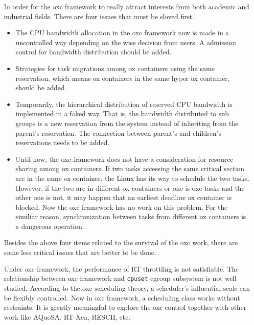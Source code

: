 In order for the oxc framework to really attract interests from both 
academic and industrial fields. There are four issues that must be 
sloved first.

\begin{itemize}
\item The CPU bandwidth allocation in the oxc framework now is made in 
a uncontrolled way depending on the wise decision from users. A admission
control for bandwidth distribution should be added.
\item Strategies for task migrations among ox containers using the same 
reservation, which means ox containers in the same hyper ox container,
should be added. 
\item Temporarily, the hierarchical distribution of reserved CPU bandwidth
is implemented in a faked way. That is, the bandwidth distributed to sub
groups is a new reservation from the system instead of inheriting from 
the parent's reservation. The connection between parent's and children's 
reservations needs to be added. 
\item Until now, the oxc framework does not have a consideration for 
resource sharing among ox containers. If two tasks accessing the same
critical section are in the same ox container, the Linux has its way
to schedule the two tasks. However, if the two are in different ox 
containers or one is oxc tasks and the other one is not, it may happen
that an earliest deadline ox container is blocked. Now the oxc framework 
has no work on this problem. For the similiar reason, synchronization
between tasks from different ox containers is a dangerous operation.
\end{itemize}

Besides the above four items related to the survival of the oxc work, 
there are some less critical issues that are better to be done.
 
Under oxc framework, the performance of RT throttling is not satisfiable.
The relationship between oxc framework and \texttt{cpuset} cgroup 
subsystem is not well studied. According to the oxc scheduling theory,
a scheduler's influential scale can be flexibly controlled. Now in oxc 
framework, a scheduling class works without restraints. It is greatly 
meaningful to explore the oxc control together with other work like AQuoSA, 
RT-Xen, RESCH, etc. 

